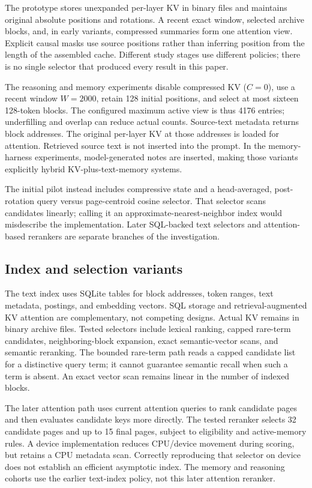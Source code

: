 \documentclass[11pt,letterpaper]{article}
\begin{document}
The prototype stores unexpanded per-layer KV in binary files and maintains original absolute positions and rotations. A recent exact window, selected archive blocks, and, in early variants, compressed summaries form one attention view. Explicit causal masks use source positions rather than inferring position from the length of the assembled cache. Different study stages use different policies; there is no single selector that produced every result in this paper.

The reasoning and memory experiments disable compressed KV ($C=0$), use a recent window $W=2000$, retain 128 initial positions, and select at most sixteen 128-token blocks. The configured maximum active view is thus 4176 entries; underfilling and overlap can reduce actual counts. Source-text metadata returns block addresses. The original per-layer KV at those addresses is loaded for attention. Retrieved source text is not inserted into the prompt. In the memory-harness experiments, model-generated notes are inserted, making those variants explicitly hybrid KV-plus-text-memory systems.

The initial pilot instead includes compressive state and a head-averaged, post-rotation query versus page-centroid cosine selector. That selector scans candidates linearly; calling it an approximate-nearest-neighbor index would misdescribe the implementation. Later SQL-backed text selectors and attention-based rerankers are separate branches of the investigation.

\subsection{Index and selection variants}
The text index uses SQLite tables for block addresses, token ranges, text metadata, postings, and embedding vectors. SQL storage and retrieval-augmented KV attention are complementary, not competing designs. Actual KV remains in binary archive files. Tested selectors include lexical ranking, capped rare-term candidates, neighboring-block expansion, exact semantic-vector scans, and semantic reranking. The bounded rare-term path reads a capped candidate list for a distinctive query term; it cannot guarantee semantic recall when such a term is absent. An exact vector scan remains linear in the number of indexed blocks.

The later attention path uses current attention queries to rank candidate pages and then evaluates candidate keys more directly. The tested reranker selects 32 candidate pages and up to 15 final pages, subject to eligibility and active-memory rules. A device implementation reduces CPU/device movement during scoring, but retains a CPU metadata scan. Correctly reproducing that selector on device does not establish an efficient asymptotic index. The memory and reasoning cohorts use the earlier text-index policy, not this later attention reranker.
\end{document}
